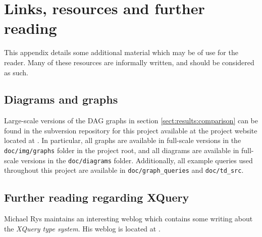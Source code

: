 \chapter{Links, resources and further reading}
\label{appendix:links_and_resources}
This appendix details some additional material which may be of use for the
reader. Many of these resources are informally written, and should
be considered as such.

\section{Diagrams and graphs}
Large-scale versions of the DAG graphs in section \ref{sect:results:comparison}
can be found in the subversion repository for this project available at the
project website located at 
.
In particular, all graphs are available in full-scale versions in the
\texttt{doc/img/graphs} folder in the project root, and all diagrams are
available in full-scale versions in the \texttt{doc/diagrams} folder.
Additionally, all example queries used throughout this project are available
in \texttt{doc/graph\_queries} and \texttt{doc/td\_src}.

\section{Further reading regarding XQuery}
Michael Rys maintains an interesting weblog which contains some writing about
the \emph{XQuery type system}. His weblog is located at
.
